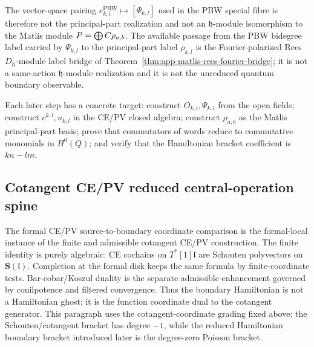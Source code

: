 \documentclass[11pt]{memoir}
\begin{document}
The vector-space pairing
$e^{\mathrm{PBW}}_{k,l}\mapsto[\Psi_{k,l}]$ used in the PBW special fibre is
therefore not the principal-part realization and not an
$\mathfrak h$-module isomorphism to the Matlis module
$P=\bigoplus C\rho_{a,b}$.  The available passage from the PBW
bidegree label carried by \(\Psi_{k,l}\) to the principal-part label
\(\rho_{k,l}\) is the Fourier-polarized Rees
$D_\hbar$-module label bridge of
Theorem~\ref{thm:app-matlis-rees-fourier-bridge}; it is not a
same-action $\mathfrak h$-module realization and it is not the unreduced
quantum boundary observable.

Each later step has a concrete target: construct
$O_{k,l},\Psi_{k,l}$ from the open fields; construct
$c^{k,l},u_{k,l}$ in the CE/PV closed algebra; construct
$\rho_{a,b}$ as the Matlis principal-part basis; prove that
commutators of words reduce to commutative monomials in $H^0(Q)$; and
verify that the Hamiltonian bracket coefficient is $kn-lm$.

\subsection{Cotangent CE/PV reduced central-operation spine}
\label{ssec:coordinate-free-ce-pv-synthesis}

The formal CE/PV source-to-boundary coordinate comparison is the
formal-local instance of the finite and admissible cotangent CE/PV
construction.  The finite identity is purely algebraic:
CE cochains on \(T^*[1]\mathfrak l\) are Schouten polyvectors on
\(\mathbf S(\mathfrak l)\).  Completion at the formal disk keeps the same
formula by finite-coordinate tests.  Bar-cobar/Koszul duality is the
separate admissible enhancement governed by conilpotence and filtered
convergence.  Thus the boundary Hamiltonian is not a Hamiltonian ghost;
it is the function coordinate dual to the cotangent generator.
This paragraph uses the cotangent-coordinate grading fixed above:
the Schouten/cotangent bracket has degree \(-1\), while the reduced
Hamiltonian boundary bracket introduced later is the degree-zero
Poisson bracket.
\end{document}
